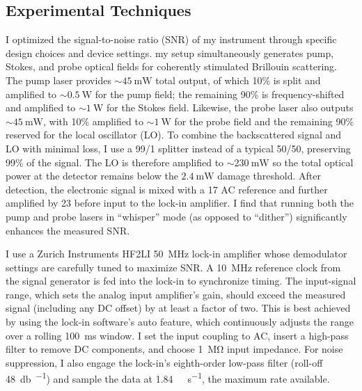 \subsection{Experimental Techniques}
\label{Methods:Experimental Techniques}
I optimized the signal-to-noise ratio (SNR) of my instrument through specific design choices and device settings. my setup simultaneously generates pump, Stokes, and probe optical fields for coherently stimulated Brillouin scattering. The pump laser provides \(\sim\!\SI{45}{\milli\watt}\) total output, of which 10\% is split and amplified to \(\sim\!\SI{0.5}{\watt}\) for the pump field; the remaining 90\% is frequency-shifted and amplified to \(\sim\!\SI{1}{\watt}\) for the Stokes field. Likewise, the probe laser also outputs \(\sim\!\SI{45}{\milli\watt}\), with 10\% amplified to \(\sim\!\SI{1}{\watt}\) for the probe field and the remaining 90\% reserved for the local oscillator (LO). To combine the backscattered signal and LO with minimal loss, I use a 99/1 splitter instead of a typical 50/50, preserving 99\% of the signal. The LO is therefore amplified to \(\sim\!\SI{230}{\milli\watt}\) so the total optical power at the detector remains below the \(\SI{2.4}{\milli\watt}\) damage threshold. After detection, the electronic signal is mixed with a \SI{17}{\dBm} AC reference and further amplified by \SI{23}{\dBm} before input to the lock-in amplifier. I find that running both the pump and probe lasers in “whisper” mode (as opposed to “dither”) significantly enhances the measured SNR.

I use a Zurich Instruments HF2LI \SI{50}{\mega\hertz} lock-in amplifier whose demodulator settings are carefully tuned to maximize SNR. A \SI{10}{\mega\hertz} reference clock from the signal generator is fed into the lock-in to synchronize timing. The input-signal range, which sets the analog input amplifier’s gain, should exceed the measured signal (including any DC offset) by at least a factor of two. This is best achieved by using the lock-in software’s auto feature, which continuously adjusts the range over a rolling \SI{100}{\milli\second} window. I set the input coupling to AC, insert a high-pass filter to remove DC components, and choose \SI{1}{\mega\ohm} input impedance. For noise suppression, I also engage the lock-in’s eighth-order low-pass filter (roll-off \SI{48}{\decibel\per\octave}) and sample the data at \SI{1.84}{\mega\sample\per\second}, the maximum rate available.

